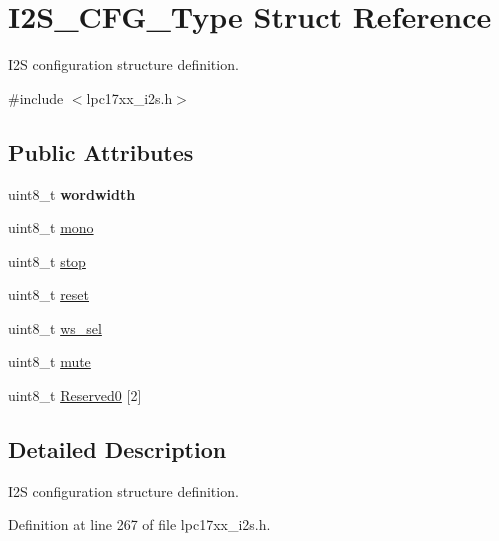 \hypertarget{struct_i2_s___c_f_g___type}{\section{\-I2\-S\-\_\-\-C\-F\-G\-\_\-\-Type \-Struct \-Reference}
\label{struct_i2_s___c_f_g___type}
}


\-I2\-S configuration structure definition.  




{\ttfamily \#include $<$lpc17xx\-\_\-i2s.\-h$>$}

\subsection*{\-Public \-Attributes}
\begin{DoxyCompactItemize}
\item 
\hypertarget{struct_i2_s___c_f_g___type_a8da4788451359801edc59e2d3c436658}{uint8\-\_\-t {\bfseries wordwidth}}\label{struct_i2_s___c_f_g___type_a8da4788451359801edc59e2d3c436658}

\item 
uint8\-\_\-t \hyperlink{struct_i2_s___c_f_g___type_add3897caf9b0990069238f838c113640}{mono}
\item 
uint8\-\_\-t \hyperlink{struct_i2_s___c_f_g___type_a5eb6c5c7757295ea877eed2418873a31}{stop}
\item 
uint8\-\_\-t \hyperlink{struct_i2_s___c_f_g___type_a81125d449923180e93f24738873725ab}{reset}
\item 
uint8\-\_\-t \hyperlink{struct_i2_s___c_f_g___type_ac6b1a4d4cc8496129ff97ee2e43bd2ec}{ws\-\_\-sel}
\item 
uint8\-\_\-t \hyperlink{struct_i2_s___c_f_g___type_af5e18d652400b3508c8d450e7481700b}{mute}
\item 
uint8\-\_\-t \hyperlink{struct_i2_s___c_f_g___type_a98c6cd2e1d30b6b29638ddcf7183de8c}{\-Reserved0} \mbox{[}2\mbox{]}
\end{DoxyCompactItemize}


\subsection{\-Detailed \-Description}
\-I2\-S configuration structure definition. 

\-Definition at line 267 of file lpc17xx\-\_\-i2s.\-h.



